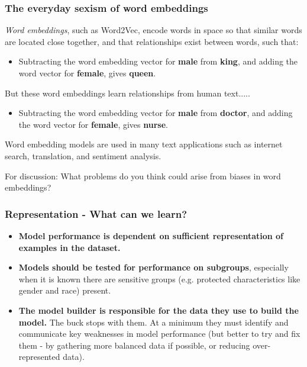 \documentclass{beamer}
\begin{document}
\begin{frame}
\frametitle{The everyday sexism of word embeddings}


\begin{itemize}
\itemsep3mm %
    \item \emph{Word embeddings}, such as Word2Vec, encode words in space so that similar words are located close together, and that relationships exist between words, such that:
    \begin{itemize}
        \item {Subtracting the word embedding vector for \textbf{male} from \textbf{king}, and adding the word vector for \textbf{female}, gives \textbf{queen}.}
    \end{itemize}
    \item{But these word embeddings learn relationships from human text.....}
        \begin{itemize}
        \item {Subtracting the word embedding vector for \textbf{male} from \textbf{doctor}, and adding the word vector for \textbf{female}, gives \textbf{nurse}.}
        \end{itemize}
    \item{Word embedding models are used in many text applications such as internet search, translation, and sentiment analysis.
    \item For discussion: What problems do you think could arise from biases in word embeddings?}
\end{itemize}

\end{frame}


\begin{frame}
\frametitle{Representation - What can we learn?}
\begin{itemize}
\setlength{\itemsep}{5mm} %
    \item \textbf{Model performance is dependent on sufficient representation of examples in the dataset.}
    
    \item \textbf{Models should be tested for performance on subgroups}, especially when it is known there are sensitive groups (e.g. protected characteristics like gender and race) present.
    
    \item \textbf{The model builder is responsible for the data they use to build the model.} The buck stops with them. At a minimum they must identify and communicate key weaknesses in model performance (but better to try and fix them - by gathering more balanced data if possible, or reducing over-represented data).
\end{itemize}
\end{frame}
\end{document}
